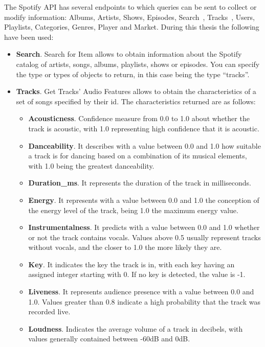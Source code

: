 \nonzeroparskip The Spotify API has several endpoints to which queries can be sent to collect or modify information: Albums, Artists, Shows, Episodes, Search~\cite{spotify_dev_endpoint_searchforitem}, Tracks~\cite{spotify_dev_endpoint_gettracksaudiofeatures}, Users, Playlists, Categories, Genres, Player and Market. During this thesis the following have been used:
\begin{itemize}
	\item \textbf{Search}. Search for Item allows to obtain information about the Spotify catalog of artists, songs, albums, playlists, shows or episodes. You can specify the type or types of objects to return, in this case being the type ``tracks''.
	\item \textbf{Tracks}. Get Tracks' Audio Features allows to obtain the characteristics of a set of songs specified by their id. The characteristics returned are as follows:
	\begin{itemize}
		\item \textbf{Acousticness}. Confidence measure from 0.0 to 1.0 about whether the track is acoustic, with 1.0 representing high confidence that it is acoustic.
		\item \textbf{Danceability}. It describes with a value between 0.0 and 1.0 how suitable a track is for dancing based on a combination of its musical elements, with 1.0 being the greatest danceability.
		\item \textbf{Duration\_ms}. It represents the duration of the track in milliseconds.
		\item \textbf{Energy}. It represents with a value between 0.0 and 1.0 the conception of the energy level of the track, being 1.0 the maximum energy value.
		\item \textbf{Instrumentalness}. It predicts with a value between 0.0 and 1.0 whether or not the track contains vocals. Values above 0.5 usually represent tracks without vocals, and the closer to 1.0 the more likely they are.
		\item \textbf{Key}. It indicates the key the track is in, with each key having an assigned integer starting with 0. If no key is detected, the value is -1.
		\item \textbf{Liveness}. It represents audience presence with a value between 0.0 and 1.0. Values greater than 0.8 indicate a high probability that the track was recorded live.
		\item \textbf{Loudness}. Indicates the average volume of a track in decibels, with values generally contained between -60dB and 0dB.

\end{itemize}
\end{itemize}
